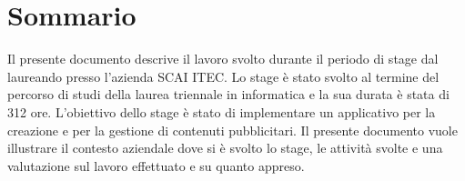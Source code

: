 
\cleardoublepage
{}
{}
\begingroup
\let\clearpage\relax
\let\cleardoublepage\relax
\let\cleardoublepage\relax

\chapter*{Sommario}

Il presente documento descrive il lavoro svolto durante il periodo di stage dal laureando \myName{} presso l'azienda SCAI ITEC.
Lo stage è stato svolto al termine del percorso di studi della laurea triennale in informatica e la sua durata è stata di 312 ore.
L'obiettivo dello stage è stato di implementare un applicativo per la creazione e per la gestione di contenuti pubblicitari.
Il presente documento vuole illustrare il contesto aziendale dove si è svolto lo stage, le attività svolte e una valutazione sul lavoro effettuato e su quanto appreso.

%
%

\endgroup			

\vfill


